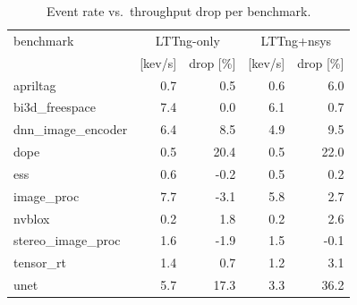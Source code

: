 \begin{table}[t]\centering\small
\caption{Event rate vs.\ throughput drop per benchmark.}\label{tab:eventrate}
\begin{tabular}{lrrrr}
\toprule
benchmark & \multicolumn{2}{c}{LTTng-only} & \multicolumn{2}{c}{LTTng+nsys} \\
 & [kev/s] & drop [\%] & [kev/s] & drop [\%] \\
\midrule
apriltag & 0.7 & 0.5 & 0.6 & 6.0 \\
bi3d\_freespace & 7.4 & 0.0 & 6.1 & 0.7 \\
dnn\_image\_encoder & 6.4 & 8.5 & 4.9 & 9.5 \\
dope & 0.5 & 20.4 & 0.5 & 22.0 \\
ess & 0.6 & -0.2 & 0.5 & 0.2 \\
image\_proc & 7.7 & -3.1 & 5.8 & 2.7 \\
nvblox & 0.2 & 1.8 & 0.2 & 2.6 \\
stereo\_image\_proc & 1.6 & -1.9 & 1.5 & -0.1 \\
tensor\_rt & 1.4 & 0.7 & 1.2 & 3.1 \\
unet & 5.7 & 17.3 & 3.3 & 36.2 \\
\bottomrule
\end{tabular}
\end{table}
